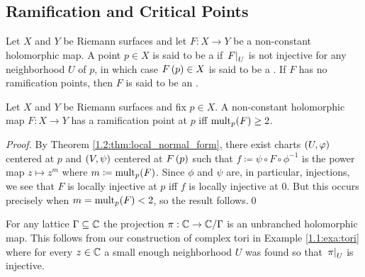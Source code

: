 \documentclass[../Moduli_Spaces_of_Riemann_Surfaces.tex]{subfiles}
\begin{document}
    \subsection{Ramification and Critical Points}
    \begin{definition}
        Let $X$ and $Y$ be Riemann surfaces and let $F:X\to Y$ be a non-constant holomorphic map. A point $p\in X$ is said to be a  if $\left.F\right|_U$ is not injective for any neighborhood $U$ of $p$, in which case $F\left(p\right)\in X$ is said to be a . If $F$ has no ramification points, then $F$ is said to be an .
    \end{definition}
    \begin{proposition}\label{2.1:prp:ramification_iff_mult_2}
        Let $X$ and $Y$ be Riemann surfaces and fix $p\in X$. A non-constant holomorphic map $F:X\to Y$ has a ramification point at $p$ iff $\operatorname{mult}_p\!\left(F\right)\geq2$.
    \end{proposition}
    \begin{proof}
        By Theorem \ref{1.2:thm:local_normal_form}, there exist charts $\left(U,\varphi\right)$ centered at $p$ and $\left(V,\psi\right)$ centered at $F\left(p\right)$ such that $f\coloneqq\psi\circ F\circ\phi^{-1}$ is the power map $z\mapsto z^m$ where $m\coloneqq\operatorname{mult}_p\!\left(F\right)$. Since $\phi$ and $\psi$ are, in particular, injections, we see that $F$ is locally injective at $p$ iff $f$ is locally injective at $0$. But this occurs precisely when $m=\operatorname{mult}_p\!\left(F\right)<2$, so the result follows.\qed
    \end{proof}
    \begin{example}\label{2.1:exa:covering_of_torus}
        For any lattice $\Gamma\subseteq\mathbb{C}$ the projection $\pi:\mathbb{C}\to\mathbb{C}/\Gamma$ is an unbranched holomorphic map. This follows from our construction of complex tori in Example \ref{1.1:exa:tori} where for every $z\in\mathbb{C}$ a small enough neighborhood $U$ was found so that $\left.\pi\right|_U$ is injective.\exqed
    \end{example}
\end{document}
